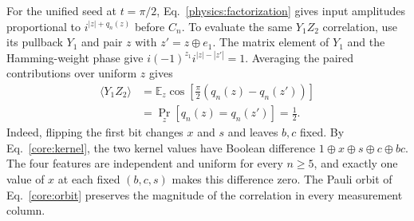 For the unified seed at $t=\pi/2$, Eq.~\eqref{physics:factorization} gives input amplitudes proportional to $i^{|z|+q_n(z)}$ before $C_n$. To evaluate the same $Y_1Z_2$ correlation, use its pullback $Y_1$ and pair $z$ with $z'=z\oplus e_1$. The matrix element of $Y_1$ and the Hamming-weight phase give $i(-1)^{z_1}i^{|z|-|z'|}=1$. Averaging the paired contributions over uniform $z$ gives
\begin{equation}
 \begin{aligned}
 \langle Y_1Z_2\rangle
 &=\mathbb E_z\cos\!\left[\tfrac{\pi}{2}(q_n(z)-q_n(z'))\right]\\
 &=\Pr_z[q_n(z)=q_n(z')]=\tfrac12.
 \end{aligned}
 \label{physics:endpoint-correlator}
\end{equation}
Indeed, flipping the first bit changes $x$ and $s$ and leaves $b,c$ fixed. By Eq.~\eqref{core:kernel}, the two kernel values have Boolean difference $1\oplus x\oplus s\oplus c\oplus bc$. The four features are independent and uniform for every $n\ge5$, and exactly one value of $x$ at each fixed $(b,c,s)$ makes this difference zero. The Pauli orbit of Eq.~\eqref{core:orbit} preserves the magnitude of the correlation in every measurement column.
